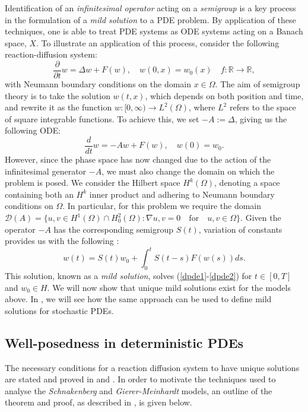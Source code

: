 \documentclass[12pt]{article}
\begin{document}
Identification of an \textit{infinitesimal operator} acting on a \textit{semigroup} is a key process in the formulation of a \textit{mild solution} to a PDE problem. By application of these techniques, one is able to treat PDE systems as ODE systems acting on a Banach space, $X$. To illustrate an application of this process, consider the following reaction-diffusion system:
\begin{equation}\label{RD}
\frac{\partial}{\partial t} w = \Delta w + F(w), \quad w(0,x) = w_0(x) \quad f: \mathbb{R} \to \mathbb{R},
\end{equation}
with Neumann boundary conditions on the domain $x \in \Omega$. The aim of semigroup theory is to take the solution $w(t,x)$, which depends on both position and time, and rewrite it as the function $w:[0,\infty) \to L^2(\Omega)$, where $L^2$ refers to the space of square integrable functions. To achieve this, we set $-A := \Delta$, giving us the following ODE:
\begin{equation}
\frac{d}{d t} w = -A w + F(w), \quad w(0) = w_0.
\end{equation}
However, since the phase space has now changed due to the action of the infinitesimal generator $-A$, we must also change the domain on which the problem is posed. We consider the Hilbert space $H^k(\Omega)$, denoting a space containing both an $H^k$ inner product and adhering to Neumann boundary conditions on $\Omega$. In particular, for this problem we require the domain $\mathcal{D}(A) = \lbrace u,v \in H^1(\Omega) \cap H^2_0(\Omega): \nabla u,v = 0 \quad \text{for} \quad u,v\in\Omega\rbrace$. Given the operator $-A$ has the corresponding semigroup $S(t)$, variation of constants provides us with the following \cite{Lord, Pazy}:
\begin{equation} \label{mildsol}
w(t) = S(t)w_0 + \int_0^t S(t-s)F(w(s))d s.
\end{equation}
This solution, known as a \textit{mild solution}, solves (\ref{dpde1}-\ref{dpde2}) for $t \in [0,T]$ and $w_0 \in H$. We will now show that unique mild solutions exist for the models above. In , we will see how the same approach can be used to define mild solutions for stochastic PDEs. 

\subsection{Well-posedness in deterministic PDEs}

The necessary conditions for a reaction diffusion system to have unique solutions are stated and proved in \cite{Jost} and \cite{Lord}. In order to motivate the techniques used to analyse the \textit{Schnakenberg} and \textit{Gierer-Meinhardt} models, an outline of the theorem and proof, as described in \cite{Lord}, is given below.
\end{document}

